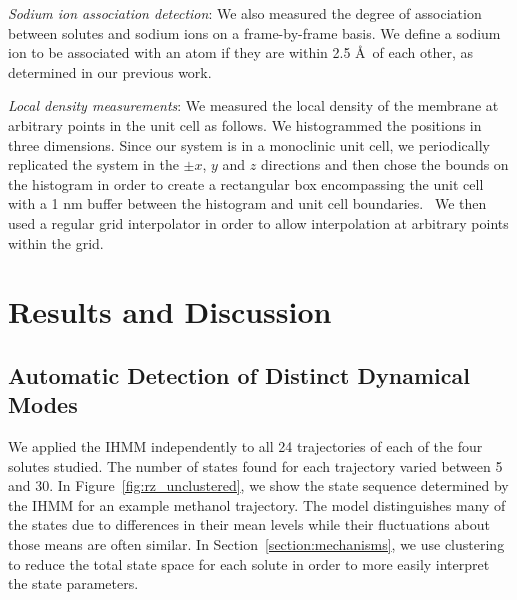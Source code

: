\documentclass[journal=jpcbfk,manuscript=article]{achemso}
\begin{document}
  \textit{Sodium ion association detection}: We also measured the degree of association
  between solutes and sodium ions on a frame-by-frame basis. We define a sodium ion to
  be associated with an atom if they are within 2.5 \AA~of each other, as determined 
  in our previous work.~\cite{coscia_chemically_2019}
  
  \textit{Local density measurements}: We measured the local density of the membrane at
  arbitrary points in the unit cell as follows. We histogrammed the positions in three 
  dimensions. Since our system is in a monoclinic unit cell, we periodically replicated
  the system in the $\pm x$, $y$ and $z$ directions and then chose the bounds on the
  histogram in order to create a rectangular box encompassing the unit cell with
  a 1 nm buffer between the histogram and unit cell boundaries.~\cite{van_der_walt_numpy_2011}
  We then used a regular grid interpolator in order to allow interpolation at arbitrary
  points within the grid.~\cite{virtanen_scipy_2020} 

  \section{Results and Discussion}
  
  \subsection{Automatic Detection of Distinct Dynamical Modes}\label{section:find_modes}
  
  We applied the IHMM independently to all 24 trajectories of each of the four solutes studied.
  The number of states found for each trajectory varied between 5 and 30.  %
  In Figure~\ref{fig:rz_unclustered}, we show the state sequence determined by the IHMM for
  an example methanol trajectory. The model distinguishes many of the states due to 
  differences in their mean levels while their fluctuations about those means are often 
  similar. In Section~\ref{section:mechanisms}, we use clustering to reduce the total state
  space for each solute in order to more easily interpret the state parameters.
  
\end{document}
